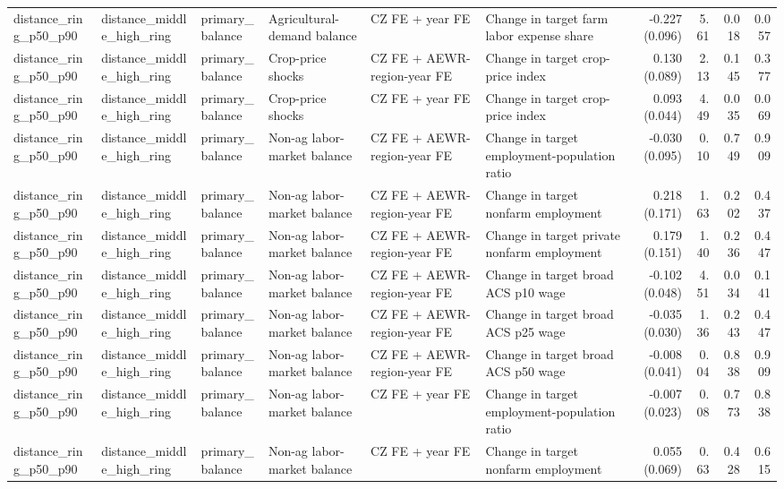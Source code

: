 \begin{tabular}{llllllrrrr}
distance_ring_p50_p90 & distance_middle_high_ring & primary_balance & Agricultural-demand balance & CZ FE + year FE & Change in target farm labor expense share & -0.227 (0.096) & 5.61 & 0.018 & 0.057 \\
distance_ring_p50_p90 & distance_middle_high_ring & primary_balance & Crop-price shocks & CZ FE + AEWR-region-year FE & Change in target crop-price index & 0.130 (0.089) & 2.13 & 0.145 & 0.377 \\
distance_ring_p50_p90 & distance_middle_high_ring & primary_balance & Crop-price shocks & CZ FE + year FE & Change in target crop-price index & 0.093 (0.044) & 4.49 & 0.035 & 0.069 \\
distance_ring_p50_p90 & distance_middle_high_ring & primary_balance & Non-ag labor-market balance & CZ FE + AEWR-region-year FE & Change in target employment-population ratio & -0.030 (0.095) & 0.10 & 0.749 & 0.909 \\
distance_ring_p50_p90 & distance_middle_high_ring & primary_balance & Non-ag labor-market balance & CZ FE + AEWR-region-year FE & Change in target nonfarm employment & 0.218 (0.171) & 1.63 & 0.202 & 0.437 \\
distance_ring_p50_p90 & distance_middle_high_ring & primary_balance & Non-ag labor-market balance & CZ FE + AEWR-region-year FE & Change in target private nonfarm employment & 0.179 (0.151) & 1.40 & 0.236 & 0.447 \\
distance_ring_p50_p90 & distance_middle_high_ring & primary_balance & Non-ag labor-market balance & CZ FE + AEWR-region-year FE & Change in target broad ACS p10 wage & -0.102 (0.048) & 4.51 & 0.034 & 0.141 \\
distance_ring_p50_p90 & distance_middle_high_ring & primary_balance & Non-ag labor-market balance & CZ FE + AEWR-region-year FE & Change in target broad ACS p25 wage & -0.035 (0.030) & 1.36 & 0.243 & 0.447 \\
distance_ring_p50_p90 & distance_middle_high_ring & primary_balance & Non-ag labor-market balance & CZ FE + AEWR-region-year FE & Change in target broad ACS p50 wage & -0.008 (0.041) & 0.04 & 0.838 & 0.909 \\
distance_ring_p50_p90 & distance_middle_high_ring & primary_balance & Non-ag labor-market balance & CZ FE + year FE & Change in target employment-population ratio & -0.007 (0.023) & 0.08 & 0.773 & 0.838 \\
distance_ring_p50_p90 & distance_middle_high_ring & primary_balance & Non-ag labor-market balance & CZ FE + year FE & Change in target nonfarm employment & 0.055 (0.069) & 0.63 & 0.428 & 0.615 \\

\end{tabular}
